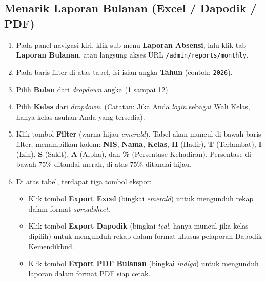 \subsection{Menarik Laporan Bulanan (Excel / Dapodik / PDF)}
\begin{enumerate}
    \item Pada panel navigasi kiri, klik sub-menu \textbf{Laporan Absensi}, lalu klik tab \textbf{Laporan Bulanan}, atau langsung akses URL \texttt{/admin/reports/monthly}.
    \item Pada baris filter di atas tabel, isi isian angka \textbf{Tahun} (contoh: \texttt{2026}).
    \item Pilih \textbf{Bulan} dari \textit{dropdown} angka (1 sampai 12).
    \item Pilih \textbf{Kelas} dari \textit{dropdown}. (Catatan: Jika Anda \textit{login} sebagai Wali Kelas, hanya kelas asuhan Anda yang tersedia).
    \item Klik tombol \textbf{Filter} (warna hijau \textit{emerald}). Tabel akan muncul di bawah baris filter, menampilkan kolom: \textbf{NIS}, \textbf{Nama}, \textbf{Kelas}, \textbf{H} (Hadir), \textbf{T} (Terlambat), \textbf{I} (Izin), \textbf{S} (Sakit), \textbf{A} (Alpha), dan \textbf{\%} (Persentase Kehadiran). Persentase di bawah 75\% ditandai merah, di atas 75\% ditandai hijau.
    \item Di atas tabel, terdapat tiga tombol ekspor:
    \begin{itemize}
        \item Klik tombol \textbf{Export Excel} (bingkai \textit{emerald}) untuk mengunduh rekap dalam format \textit{spreadsheet}.
        \item Klik tombol \textbf{Export Dapodik} (bingkai \textit{teal}, hanya muncul jika kelas dipilih) untuk mengunduh rekap dalam format khusus pelaporan Dapodik Kemendikbud.
        \item Klik tombol \textbf{Export PDF Bulanan} (bingkai \textit{indigo}) untuk mengunduh laporan dalam format PDF siap cetak.
    \end{itemize}
\end{enumerate}


